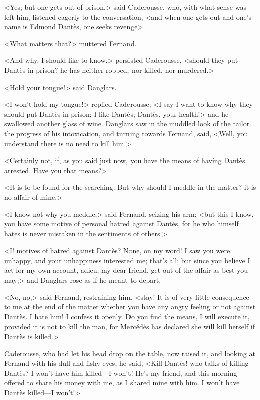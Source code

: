  <Yes; but one gets out of prison,> said Caderousse, who, with what sense was left him, listened eagerly to the conversation, <and when one gets out and one's name is Edmond Dantès, one seeks revenge\longdash> 

 <What matters that?> muttered Fernand. 

 <And why, I should like to know,> persisted Caderousse, <should they put Dantès in prison? he has neither robbed, nor killed, nor murdered.> 

 <Hold your tongue!> said Danglars. 

 <I won't hold my tongue!> replied Caderousse; <I say I want to know why they should put Dantès in prison; I like Dantès; Dantès, your health!> and he swallowed another glass of wine.  Danglars saw in the muddled look of the tailor the progress of his intoxication, and turning towards Fernand, said, <Well, you understand there is no need to kill him.> 

 <Certainly not, if, as you said just now, you have the means of having Dantès arrested. Have you that means?> 

 <It is to be found for the searching. But why should I meddle in the matter? it is no affair of mine.> 

 <I know not why you meddle,> said Fernand, seizing his arm; <but this I know, you have some motive of personal hatred against Dantès, for he who himself hates is never mistaken in the sentiments of others.> 

 <I\@! motives of hatred against Dantès? None, on my word! I saw you were unhappy, and your unhappiness interested me; that's all; but since you believe I act for my own account, adieu, my dear friend, get out of the affair as best you may;> and Danglars rose as if he meant to depart. 

 <No, no,> said Fernand, restraining him, <stay! It is of very little consequence to me at the end of the matter whether you have any angry feeling or not against Dantès. I hate him! I confess it openly. Do you find the means, I will execute it, provided it is not to kill the man, for Mercédès has declared she will kill herself if Dantès is killed.> 

 Caderousse, who had let his head drop on the table, now raised it, and looking at Fernand with his dull and fishy eyes, he said, <Kill Dantès! who talks of killing Dantès? I won't have him killed—I won't! He's my friend, and this morning offered to share his money with me, as I shared mine with him. I won't have Dantès killed—I won't!> 

